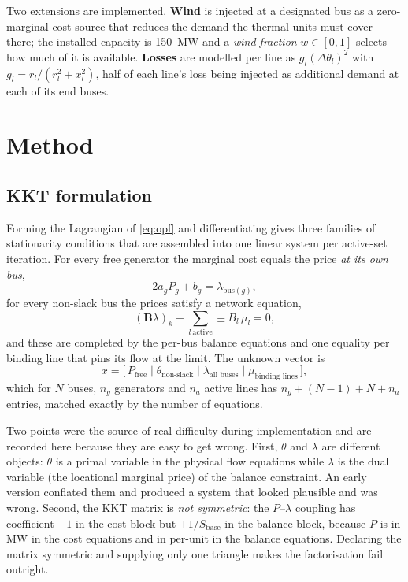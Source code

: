 \documentclass[conference]{IEEEtran}
\begin{document}
Two extensions are implemented. \textbf{Wind} is injected at a designated bus as a zero-marginal-cost source that reduces the demand the thermal units must cover there; the installed capacity is 150~MW and a \emph{wind fraction} $w\in[0,1]$ selects how much of it is available. \textbf{Losses} are modelled per line as $g_l(\Delta\theta_l)^2$ with $g_l = r_l/(r_l^2+x_l^2)$, half of each line's loss being injected as additional demand at each of its end buses.

\section{Method}
\subsection{KKT formulation}
Forming the Lagrangian of \eqref{eq:opf} and differentiating gives three families of stationarity conditions that are assembled into one linear system per active-set iteration. For every free generator the marginal cost equals the price \emph{at its own bus},
\begin{equation}
  2a_gP_g + b_g = \lambda_{\mathrm{bus}(g)} ,
\end{equation}
for every non-slack bus the prices satisfy a network equation,
\begin{equation}
  (\mathbf{B}\lambda)_k + \sum_{l\ \text{active}} \pm B_l\,\mu_l = 0 ,
\end{equation}
and these are completed by the per-bus balance equations and one equality per binding line that pins its flow at the limit. The unknown vector is
\[
  x = \bigl[\,P_{\text{free}} \mid \theta_{\text{non-slack}} \mid \lambda_{\text{all buses}} \mid \mu_{\text{binding lines}}\,\bigr] ,
\]
which for $N$ buses, $n_g$ generators and $n_a$ active lines has $n_g+(N-1)+N+n_a$ entries, matched exactly by the number of equations.

Two points were the source of real difficulty during implementation and are recorded here because they are easy to get wrong. First, $\theta$ and $\lambda$ are different objects: $\theta$ is a primal variable in the physical flow equations while $\lambda$ is the dual variable (the locational marginal price) of the balance constraint. An early version conflated them and produced a system that looked plausible and was wrong. Second, the KKT matrix is \emph{not symmetric}: the $P$--$\lambda$ coupling has coefficient $-1$ in the cost block but $+1/S_{\mathrm{base}}$ in the balance block, because $P$ is in MW in the cost equations and in per-unit in the balance equations. Declaring the matrix symmetric and supplying only one triangle makes the factorisation fail outright.
\end{document}
